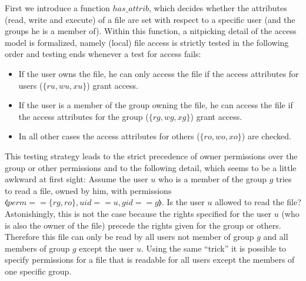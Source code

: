 First we introduce a function $has\_attrib$, which decides whether the
attributes (read, write and execute) of a file are set with respect to a
specific user (and the groups he is a member of). Within this function, a
nitpicking detail of the \susv{} access model is formalized, namely (local) file
access is strictly tested in the following order and testing ends whenever a
test for access fails:
\begin{itemize}
\item If the user owns the file, he can only access the file if the access
  attributes for users ($\{ru,wu,xu\}$) grant access.
\item If the user is a member of the group owning the file, he can access the
  file if the access attributes for the group ($\{rg, wg, xg\}$) grant access.
\item In all other cases the access attributes for others ($\{ro,wo,xo\}$) are
  checked.
\end{itemize}
This testing strategy leads to the strict precedence of owner permissions over
the group or other permissions and to the following detail, which seems to be a
little awkward at first sight: Assume the user $u$ who is a member of the group
$g$ tries to read a file, owned by him, with permissions $\lblot
perm==\{rg,ro\},uid==u,gid==g \rblot$. Is the user $u$ allowed to read the file?
Astonishingly, this is not the case because the rights specified for the user
$u$ (who is also the owner of the file) precede the rights given for the group
or others.  Therefore this file can only be read by all users not member of
group $g$ and all members of group $g$ except the user $u$.  Using the same
``trick'' it is possible to specify permissions for a file that is readable for
all users except the members of one specific group.

